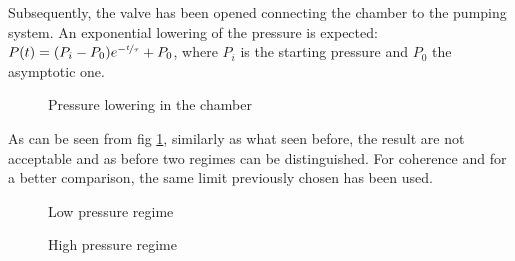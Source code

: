 \documentclass[11pt,a4 paper]{article}
\let\oldfrac\frac
\renewcommand{\frac}[3][d]{\ifthenelse{\equal{#1}{d}}{\oldfrac{#2}{#3}}{\nicefrac{#2}{#3}}}
\begin{document}
Subsequently, the valve has been opened connecting the chamber to the pumping system. An exponential lowering of the pressure is expected: $P(t) = (P_i - P_0)e^{-\frac[f]{t}{\tau}} + P_0$, where $P_i$ is the starting pressure and $P_0$ the asymptotic one.

\begin{figure}[H]
  \centering
   \hspace{-0.05\textwidth}
  \caption{Pressure lowering in the chamber}
  \label{fig:decrease_all}
\end{figure}

As can be seen from fig \ref{fig:decrease_all}, similarly as what seen before, the result are not acceptable and as before two regimes can be distinguished. For coherence and for a better comparison, the same limit previously chosen has been used.

\begin{figure}[H]
  \centering
   \hspace{-0.05\textwidth}
  \caption{Low pressure regime}
  \label{fig:decrease_lowP}
\end{figure}

\begin{figure}[H]
  \centering
   \hspace{-0.05\textwidth}
  \caption{High pressure regime}
  \label{fig:decrease_highP}
\end{figure}



\end{document}
